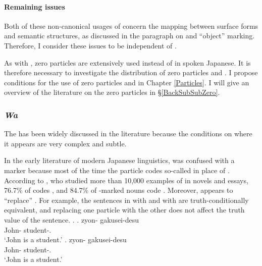 \paragraph{Remaining issues}

Both of these non-canonical usages of  concern the mapping
between surface forms and semantic structures,
as discussed in the paragraph on  and ``object'' marking.
Therefore, I consider these issues to be independent of .

As with ,
zero particles are extensively used instead of  in spoken Japanese.
It is therefore necessary to investigate the distribution of zero particles and .
I propose conditions for the use of zero particles and  in Chapter \ref{Particles}.
I will give an overview of the literature on the zero particles in \S \ref{BackSubSubZero}.




\subsubsection{\textit{Wa}}\label{Back:GeneralChar:Wa}



The   has been widely discussed in the literature
because the conditions on where it appears are very complex and subtle.

In the early literature of modern Japanese linguistics,
 was confused with a  marker
because most of the time the particle codes so-called  in place of .
According to ,
who studied more than 10,000 examples of 
in novels and essays,
76.7\% of  codes , and
84.7\% of -marked nouns code .
Moreover,
 appears to ``replace'' .
For example,
the sentences in \Next[a] with  and \Next[b] with 
are truth-conditionally equivalent, and
replacing one particle with the other does not affect the truth value
of the sentence.
%
\ex.
 \ag. zyon- gakusei-desu \\
      John- student-. \\
      `John is a student.'
 \bg. zyon- gakusei-desu \\
      John- student-. \\
      `John is a student.'
      \hfill{\cite[38]{kuno73}}

